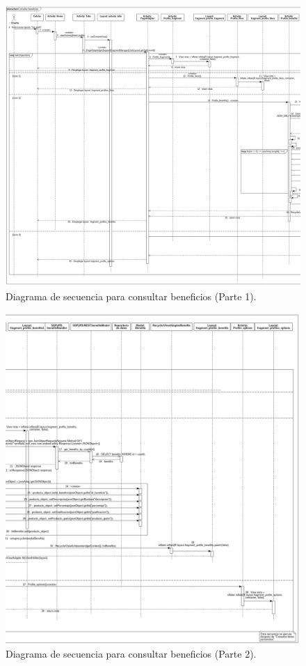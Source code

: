 \FloatBarrier
\begin{figure}[htbp!]
		\centering
			\includegraphics[width=1 \textwidth]{imagenes/Diagramas_UserApp/Nuevos_diagramas/beneficios1}
		\caption{Diagrama de secuencia para consultar beneficios (Parte 1).}
		\label{image:beneficios2}
\end{figure}
\FloatBarrier

\FloatBarrier
\begin{figure}[htbp!]
		\centering
			\includegraphics[width=.9 \textwidth]{imagenes/Diagramas_UserApp/Nuevos_diagramas/beneficios2}
		\caption{Diagrama de secuencia para consultar beneficios (Parte 2).}
		\label{image:beneficios3}
\end{figure}
\FloatBarrier

